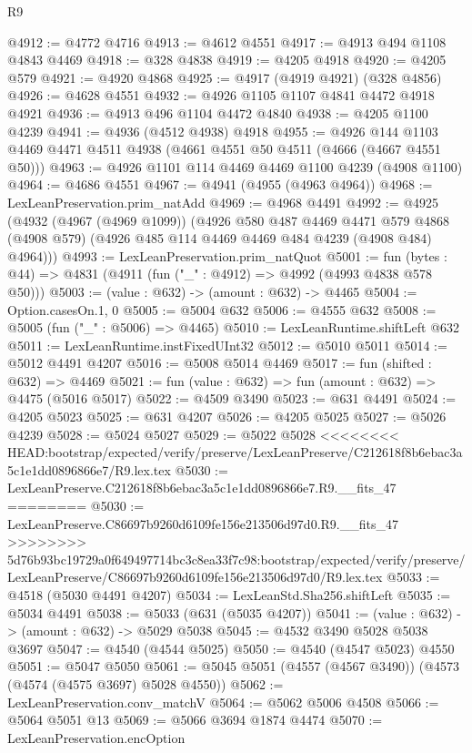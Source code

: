 \begin{lexlean}{R9}
\begin{coremodule}
{{{{{{{{{{{{{{{{{{{{{{{{{{{{{{{{{{{{{{{{{{{{{{{{{{{{{{{{{{{{{{{{{{{{{{{{{{{{{{{{{{{{{{{{{{{{{{{{{{{{{{{{{{{{@4912 := @4772 @4716
@4913 := @4612 @4551
@4917 := @4913 @494 @1108 @4843 @4469
@4918 := @328 @4838
@4919 := @4205 @4918
@4920 := @4205 @579
@4921 := @4920 @4868
@4925 := @4917 (@4919 @4921) (@328 @4856)
@4926 := @4628 @4551
@4932 := @4926 @1105 @1107 @4841 @4472 @4918 @4921
@4936 := @4913 @496 @1104 @4472 @4840
@4938 := @4205 @1100 @4239
@4941 := @4936 (@4512 @4938) @4918
@4955 := @4926 @144 @1103 @4469 @4471 @4511 @4938 (@4661 @4551 @50 @4511 (@4666 (@4667 @4551 @50)))
@4963 := @4926 @1101 @114 @4469 @4469 @1100 @4239 (@4908 @1100)
@4964 := @4686 @4551
@4967 := @4941 (@4955 (@4963 @4964))
@4968 := LexLeanPreservation.prim_natAdd
@4969 := @4968 @4491
@4992 := @4925
    (@4932
      (@4967 (@4969 @1099))
      (@4926
        @580
        @487
        @4469
        @4471
        @579
        @4868
        (@4908 @579)
        (@4926 @485 @114 @4469 @4469 @484 @4239 (@4908 @484) @4964)))
@4993 := LexLeanPreservation.prim_natQuot
@5001 := fun (bytes : @44) => @4831 (@4911 (fun ("_" : @4912) => @4992 (@4993 @4838 @578 @50)))
@5003 := (value : @632) -> (amount : @632) -> @4465
@5004 := Option.casesOn.{1, 0}
@5005 := @5004 @632
@5006 := @4555 @632
@5008 := @5005 (fun ("_" : @5006) => @4465)
@5010 := LexLeanRuntime.shiftLeft @632
@5011 := LexLeanRuntime.instFixedUInt32
@5012 := @5010 @5011
@5014 := @5012 @4491 @4207
@5016 := @5008 @5014 @4469
@5017 := fun (shifted : @632) => @4469
@5021 := fun (value : @632) => fun (amount : @632) => @4475 (@5016 @5017)
@5022 := @4509 @3490
@5023 := @631 @4491
@5024 := @4205 @5023
@5025 := @631 @4207
@5026 := @4205 @5025
@5027 := @5026 @4239
@5028 := @5024 @5027
@5029 := @5022 @5028
<<<<<<<< HEAD:bootstrap/expected/verify/preserve/LexLeanPreserve/C212618f8b6ebac3a5c1e1dd0896866e7/R9.lex.tex
@5030 := LexLeanPreserve.C212618f8b6ebac3a5c1e1dd0896866e7.R9.__fits_47
========
@5030 := LexLeanPreserve.C86697b9260d6109fe156e213506d97d0.R9.__fits_47
>>>>>>>> 5d76b93bc19729a0f649497714bc3c8ea33f7c98:bootstrap/expected/verify/preserve/LexLeanPreserve/C86697b9260d6109fe156e213506d97d0/R9.lex.tex
@5033 := @4518 (@5030 @4491 @4207)
@5034 := LexLeanStd.Sha256.shiftLeft
@5035 := @5034 @4491
@5038 := @5033 (@631 (@5035 @4207))
@5041 := (value : @632) -> (amount : @632) -> @5029 @5038
@5045 := @4532 @3490 @5028 @5038 @3697
@5047 := @4540 (@4544 @5025)
@5050 := @4540 (@4547 @5023) @4550
@5051 := @5047 @5050
@5061 := @5045 @5051 (@4557 (@4567 @3490)) (@4573 (@4574 (@4575 @3697) @5028 @4550))
@5062 := LexLeanPreservation.conv_matchV
@5064 := @5062 @5006 @4508
@5066 := @5064 @5051 @13
@5069 := @5066 @3694 @1874 @4474
@5070 := LexLeanPreservation.encOption
}}}}}}}}}}}}}}}}}}}}}}}}}}}}}}}}}}}}}}}}}}}}}}}}}}}}}}}}}}}}}}}}}}}}}}}}}}}}}}}}}}}}}}}}}}}}}}}}}}}}}}}}}}}}
\end{coremodule}
\end{lexlean}
